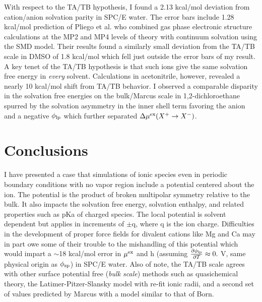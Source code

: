 \begin{tatb}
  With respect to the TA\sur{+}/TB\sur{-} hypothesis, I found a 2.13 kcal/mol deviation from cation/anion solvation parity in SPC/E water. The error bars include 1.28
  kcal/mol prediction of Pliego et al.\cite{pliego2015ccqct} who combined gas phase electronic structure calculations at the MP2 and MP4 levels of theory with continuum
  solvation using the SMD model. Their results found a similarly small deviation from the TA\sur{+}/TB\sur{-} scale in DMSO of 1.8 kcal/mol which fell just outside the
  error bars of my result. A key tenet of the TA\sur{+}/TB\sur{-} hypothesis is that such ions give the same solvation free energy in \emph{every} solvent. Calculations
  in acetonitrile, however, revealed a nearly 10 kcal/mol shift from TA\sur{+}/TB\sur{-} behavior. I observed a comparable disparity in the solvation free energies on
  the bulk/Marcus scale in 1,2-dichloroethane spurred by the solvation asymmetry in the inner shell term favoring the anion and a negative $\phi_{\mathrm{lp}}$ which further
  separated $\Delta\mu^{\mathrm{ex}}(X^{\mathrm{+}}\rightarrow X^{\mathrm{-}})$.

  \section{\label{ch6:sec4:level1}Conclusions~}
  I have presented a case that simulations of ionic species even in periodic boundary conditions with no vapor region include a potential centered about the ion.
  The potential is the product of broken multipolar symmetry relative to the bulk. It also impacts the solvation free energy, solvation enthalpy, and related
  properties such as pKa of charged species. The local potential is solvent dependent but applies in increments of $\pm$q, where q is the ion charge. Difficulties in
  the development of proper force fields for divalent cations like Mg and Ca may in part owe some of their trouble to the mishandling of this 
  potential which would impart a $\sim$18 kcal/mol error in $\mu^{\mathrm{ex}}$ and h (assuming $\frac{\partial\phi_{\mathrm{lp}}}{\partial T} \approx 0.~$V, same physical
  origin as $\phi_{\mathrm{sp}}$\cite{gabdoulline1997mean}) in SPC/E  water. Also of note, the TA\sur{+}/TB\sur{-} scale agrees with other surface potential free (\emph{bulk scale})
  methods such as quasichemical theory\cite{asthagiri2003absolute,asthagiri2004hydration,pollard2014cpa1}, the Latimer-Pitzer-Slansky model with re-fit ionic 
  radii\cite{ashbaugh2008lps}, and a second set of values predicted by Marcus with a model similar to that of Born\cite{marcus1985book}.
  

\end{tatb}
